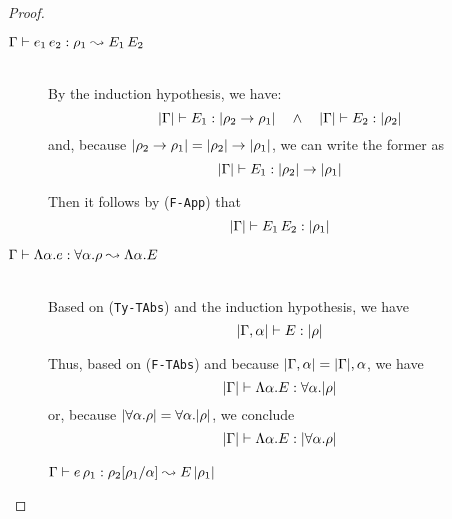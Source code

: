 \begin{proof}
\begin{description}
\item[\quad$\Gamma \vdash e_1\,e_2 : \rho_1 \leadsto E_1\,E_2$] \ \\

  By the induction hypothesis, we have:
\begin{equation*} 
   |\Gamma| \vdash E_1 : |\rho_2 \rightarrow \rho_1| \quad\wedge\quad |\Gamma| \vdash E_2 : |\rho_2|
\end{equation*} 
  and, because $|\rho_2 \rightarrow \rho_1| = |\rho_2| \rightarrow |\rho_1|$, we can write the former as
\begin{equation*} 
   |\Gamma| \vdash E_1 : |\rho_2| \rightarrow |\rho_1|
\end{equation*} 

  Then it follows by (\texttt{F-App}) that
\begin{equation*} 
   |\Gamma| \vdash E_1\, E_2 : |\rho_1|
\end{equation*} 

\item[\quad$\Gamma \vdash \Lambda \alpha.e : \forall \alpha. \rho \leadsto \Lambda \alpha.E$]\ \\

  Based on (\texttt{Ty-TAbs}) and the induction hypothesis, we have
\begin{equation*} 
    |\Gamma, \alpha| \vdash E : |\rho|
\end{equation*}

  Thus, based on (\texttt{F-TAbs}) and because $|\Gamma,\alpha| = |\Gamma|,\alpha$, we have
\begin{equation*} 
    |\Gamma| \vdash \Lambda \alpha. E : \forall \alpha.|\rho|
\end{equation*}
  or, because $|\forall\alpha.\rho|=\forall\alpha.|\rho|$, we conclude
\begin{equation*} 
    |\Gamma| \vdash \Lambda \alpha. E : |\forall \alpha.\rho|
\end{equation*}

\item[]\quad$\Gamma \vdash e\,\rho_1 : \rho_2[\rho_1/\alpha] \leadsto E\,|\rho_1|$\ \\
 

\end{description}
\end{proof}
